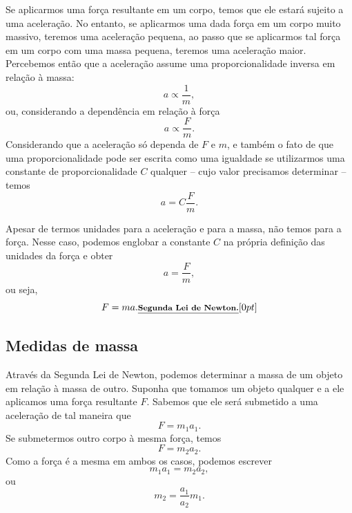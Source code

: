 Se aplicarmos uma força resultante em um corpo, temos que ele estará sujeito a uma aceleração. No entanto, se aplicarmos uma dada força em um corpo muito massivo, teremos uma aceleração pequena, ao passo que se aplicarmos tal força em um corpo com uma massa pequena, teremos uma aceleração maior. Percebemos então que a aceleração assume uma proporcionalidade inversa em relação à massa:
\begin{equation}
  a \propto \frac{1}{m},
\end{equation}
%
ou, considerando a dependência em relação à força
\begin{equation}
  a \propto \frac{F}{m}.
\end{equation}
%
Considerando que a aceleração só dependa de $F$ e $m$, e também o fato de que uma proporcionalidade pode ser escrita como uma igualdade se utilizarmos uma constante de proporcionalidade $C$ qualquer -- cujo valor precisamos determinar -- temos
\begin{equation}
  a = C \frac{F}{m}.
\end{equation}

Apesar de termos unidades para a aceleração e para a massa, não temos para a força. Nesse caso, podemos englobar a constante $C$ na própria definição das unidades da força e obter
\begin{equation}
  a = \frac{F}{m},
\end{equation}
%
ou seja,
\begin{equation}
  F = m a. \relax{\footnotesize\emph{\textbf{Segunda Lei de Newton.}}}[0pt]
\end{equation}

\subsection{Medidas de massa}

Através da Segunda Lei de Newton, podemos determinar a massa de um objeto em relação à massa de outro. Suponha que tomamos um objeto qualquer e a ele aplicamos uma força resultante $F$. Sabemos que ele será submetido a uma aceleração de tal maneira que
\begin{equation}
  F = m_1 a_1.
\end{equation}
%
Se submetermos outro corpo à mesma força, temos
\begin{equation}
  F = m_2 a_2.
\end{equation}
%
Como a força é a mesma em ambos os casos, podemos escrever
\begin{equation}
  m_1 a_1 = m_2 a_2,
\end{equation}
%
ou
\begin{equation}
  m_2 = \frac{a_1}{a_2}m_1.
\end{equation}

